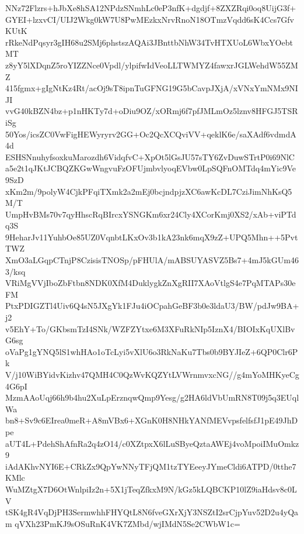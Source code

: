 NNz72Flzrs+hJbXe8hSA12NPdzSNmhLc0eP3nfK+dgdjf+8ZXZRqi0oq8UijG3f+
GYEI+lzxvCI/UIJ2Wkg0kW7U8PwMEzkxNrvRnoN18OTmzVqdd6sK4Ccs7GfvKUtK
rRkeNdPqsyr3gIH68u2SMj6phstszAQAi3JBnttbNhW34TvHTXUoL6WbxYOebtMT
z8yY5lXDqnZ5roYIZZNce0Vpdl/ylpifwIdVeoLLTWMYZ4fawxrJGLWehdW55ZMZ
415fgmx+gIgNtKz4Rt/acOj9sT8ipnTuGFNG19G5bCavpJXjA/xVNxYmNMx9NIJI
vvG40kBZN4bz+p1nHKTy7d+oDiu9OZ/xORmj6f7pfJMLmOz5lznv8HFGJ5TSRiSg
50Yos/icsZC0VwFigHEWyryrv2GG+Oc2QcXCQviVV+qeklK6e/saXAdf6vdmdA4d
ESHSNnuhyfsoxkuMarozdh6VidqfvC+XpOt5lGsJU57sTY6ZvDuwSTrtP0i69NlC
a5e2t1qJKtJCBQZKGwWngvuFzOFUjmbvlyoqEVbw0LpSQFnOMTdq4mYic9Ve9SzD
xKm2m/9polyW4CjkPFqiTXmk2a2mEj0bcjndpjzXC6awKcDL7CziJimNhKsQ5M/T
UmpHvBMs70v7qyHhscRqBIrcxYSNGKm6xr24Cly4XCorKmj0XS2/xAb+viPTdq3S
9HeharJv11YuhbOe85UZ0VqnbtLKxOv3b1kA23nk6mqX9zZ+UPQ5Mhn++5PvtTWZ
XmO3aLGqpCTnjP8CzisisTNOSp/pFHUlA/mABSUYASVZ5Bs7+4mJ5kGUm463/ksq
VRiMgVVjIboZbFtbn8NDK0XfM4DuklygkZnXgRII7XAoVtlgS4e7PqMTAPs30eFM
PtxPDIGZTl4Uiv6Q4sN5JXgYk1FJu4iOCpahGeBF3b0e3ldaU3/BW/pdJw9BA+j2
v5EhY+To/GKbsmTzI4SNk/WZFZYtxe6M3XFuRkNIp5IznX4/BIOIxKqUXlBvG6sg
oVaPg1gYNQ5lS1whHAo1oTcLyi5vXlU6o3RkNaKu7Tbs0b9BYJIeZ+6QP0Clr6Pk
V/j10WiBYidvKizhv47QMH4C0QzWvKQZYtLVWrnmvxcNG//g4mYoMHKyeCg4G6pI
MzmAAoUqj66h9b4hu2XuLpErznqwQmp9Yesg/g2HA6ldVbUmRN8T09j5q3EUqlWa
bn8+Sv9c6EIrea0meR+A8mVBx6+XGnK0H8NHkYANfMEVvpsfelfsfJ1pE49JhDpe
aUT4L+PdehShAfnRa2q4zO14/c0XZtpxX6lLuSByeQztaAWEj4voMpoiIMuOmkz9
iAdAKhvNYI6E+CRkZx9QpYwNNyTFjQM1tzTYEeeyJYmeCldi6ATPD/0tthe7KMlc
WuMZtgX7D6OtWnlpiIz2n+5X1jTeqZfkxM9N/kGz5kLQBCKP10lZ9iaHdsv8c0LV
tSK4gR4VqDjPH3SermwhhFHYQtL8N6fveGXrXjY3NSZtI2srCjpYuv52D2u4yQam
qVXh23PmKJ9sOSuRnK4VK7ZMbd/wjIMdN5Se2CWbW1c=
